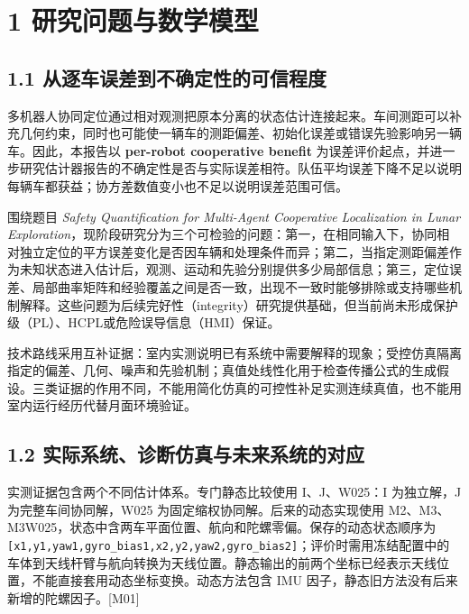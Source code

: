 \documentclass[12pt,a4paper]{article}
\begin{document}
\section{1
研究问题与数学模型}\label{ux7814ux7a76ux95eeux9898ux4e0eux6570ux5b66ux6a21ux578b}

\subsection{1.1
从逐车误差到不确定性的可信程度}\label{ux4eceux9010ux8f66ux8befux5deeux5230ux4e0dux786eux5b9aux6027ux7684ux53efux4fe1ux7a0bux5ea6}

多机器人协同定位通过相对观测把原本分离的状态估计连接起来。车间测距可以补充几何约束，同时也可能使一辆车的测距偏差、初始化误差或错误先验影响另一辆车。因此，本报告以
\textbf{per-robot cooperative benefit}
为误差评价起点，并进一步研究估计器报告的不确定性是否与实际误差相符。队伍平均误差下降不足以说明每辆车都获益；协方差数值变小也不足以说明误差范围可信。

围绕题目 \emph{Safety Quantification for Multi-Agent Cooperative
Localization in Lunar
Exploration}，现阶段研究分为三个可检验的问题：第一，在相同输入下，协同相对独立定位的平方误差变化是否因车辆和处理条件而异；第二，当指定测距偏差作为未知状态进入估计后，观测、运动和先验分别提供多少局部信息；第三，定位误差、局部曲率矩阵和经验覆盖之间是否一致，出现不一致时能够排除或支持哪些机制解释。这些问题为后续完好性（integrity）研究提供基础，但当前尚未形成保护级（PL）、HCPL或危险误导信息（HMI）保证。

技术路线采用互补证据：室内实测说明已有系统中需要解释的现象；受控仿真隔离指定的偏差、几何、噪声和先验机制；真值处线性化用于检查传播公式的生成假设。三类证据的作用不同，不能用简化仿真的可控性补足实测连续真值，也不能用室内运行经历代替月面环境验证。

\subsection{1.2
实际系统、诊断仿真与未来系统的对应}\label{ux5b9eux9645ux7cfbux7edfux8bcaux65adux4effux771fux4e0eux672aux6765ux7cfbux7edfux7684ux5bf9ux5e94}

实测证据包含两个不同估计体系。专门静态比较使用 I、J、W025：I 为独立解，J
为完整车间协同解，W025 为固定缩权协同解。后来的动态实现使用
M2、M3、M3W025，状态中含两车平面位置、航向和陀螺零偏。保存的动态状态顺序为
\texttt{{[}x1,y1,yaw1,gyro\_bias1,x2,y2,yaw2,gyro\_bias2{]}}；评价时需用冻结配置中的车体到天线杆臂与航向转换为天线位置。静态输出的前两个坐标已经表示天线位置，不能直接套用动态坐标变换。动态方法包含
IMU 因子，静态旧方法没有后来新增的陀螺因子。{[}M01{]}
\end{document}
